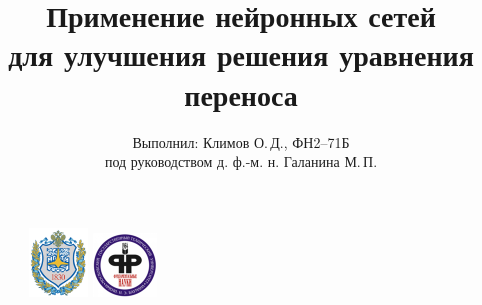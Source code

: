 \documentclass{beamer}
\begin{document}
\title{Применение нейронных сетей\\для улучшения решения уравнения переноса}
\author{Выполнил: Климов О.\,Д., ФН2--71Б \\ под руководством д. ф.-м. н. Галанина М.\,П.}
\date{}


\begin{frame}
\begin{figure}[!hp]
	\includegraphics[width=0.14\textwidth]{logo/logo1}
	\includegraphics[width=0.15\textwidth]{logo/logo2}
\end{figure}
\titlepage
\end{frame}
\end{document}
